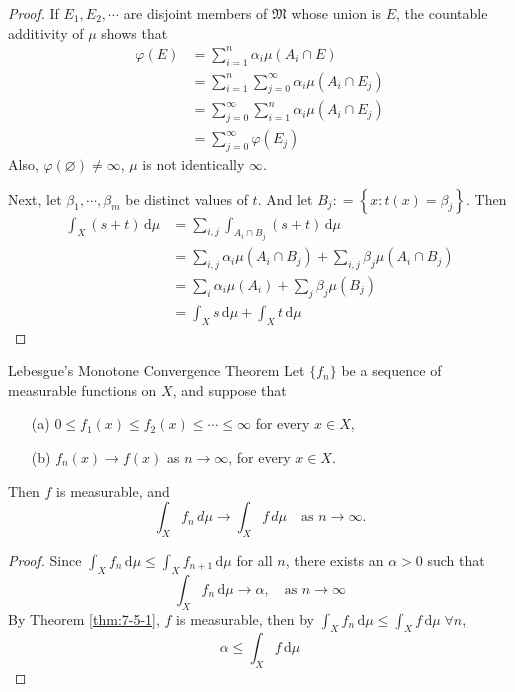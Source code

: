 \documentclass[../main.tex]{subfiles}
\begin{document}
\begin{proof}
    If  \(  E_1,E_2,\cdots   \) are disjoint members of  \(  \mathfrak{M}  \) whose union is \(  E  \), the countable additivity of \(  \mu   \) shows that  \[
    \begin{aligned}
     \varphi \left( E \right)&= \sum _{i= 1}^{n} \alpha _{i}\mu \left( A_{i}\cap E \right)\\ 
      &=  \sum _{i = 1}^{n}\sum _{j = 0}^{\infty} \alpha _{i}\mu \left( A_{i}\cap E_{j} \right) \\ 
       &= \sum _{j = 0}^{\infty}\sum _{i = 1}^{n}\alpha _{i}\mu \left( A_{i}\cap E_{j} \right)\\ 
        &= \sum _{j = 0}^{\infty} \varphi \left( E_{j} \right) 
    \end{aligned} 
    \] Also, \(   \varphi \left( \varnothing \right)\neq \infty   \), \(  \mu   \) is not identically   \(  \infty  \).  

    Next, let \(  \beta _1 ,\cdots ,\beta _{m}  \) be distinct values of \(  t  \).   And let \(  B_{j}: = \left\{ x: t\left( x \right)= \beta _{j}  \right\}  \). Then \[
    \begin{aligned}
    \int_{X}\left( s+ t \right)\,\mathrm{d} \mu &= \sum _{i,j}\int_{A_{i}\cap B_{j}}\left( s+ t \right)\,\mathrm{d} \mu \\ 
     &= \sum _{i,j}\alpha _{i}\mu \left( A_{i}\cap B_{j} \right)+ \sum _{i,j}\beta _{j}\mu \left( A_{i}\cap B_{j} \right)\\ 
      &=         \sum _{i}\alpha _{i}\mu \left( A_{i} \right)+ \sum _{j}\beta _{j}\mu \left( B_{j} \right)\\ 
       &= \int_{X}s \,\mathrm{d} \mu + \int_{X} t\,\mathrm{d} \mu   
    \end{aligned}
    \] 
\end{proof}

\begin{theorem}{Lebesgue's Monotone Convergence Theorem}{}
Let $\{f_n\}$ be a sequence of measurable functions on $X$, and suppose that
\begin{enumerate}
\item[(a)] $0 \le f_1(x) \le f_2(x) \le \cdots \le \infty$ for every $x \in X$,
\item[(b)] $f_n(x) \to f(x)$ as $n \to \infty$, for every $x \in X$.
\end{enumerate}
Then $f$ is measurable, and
\[
\int_X f_n \, d\mu \to \int_X f \, d\mu \quad \text{as } n \to \infty.
\]
\end{theorem}

\begin{proof}
    Since \(  \int_{X} f_{n}\,\mathrm{d} \mu \le \int_{X}f_{n+ 1}\,\mathrm{d} \mu   \) for all \(  n  \), there exists an \(  \alpha > 0  \) such that \[
    \int_{X}f_{n}\,\mathrm{d} \mu \to \alpha ,\quad \text{as } n \to \infty
    \]   By Theorem \ref{thm:7-5-1}, \(  f  \) is measurable,  then by \(  \int_{X}f_{n}\,\mathrm{d} \mu \le \int_{X} f\,\mathrm{d} \mu    \;\forall n\), \[
    \alpha \le \int_{X}f \,\mathrm{d} \mu 
    \]  
\end{proof}
\end{document}
